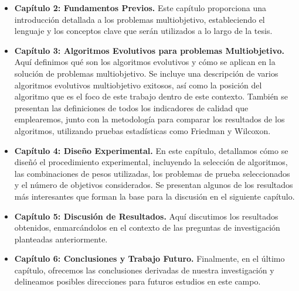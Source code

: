 \begin{itemize}
    \item \textbf{Capítulo 2: Fundamentos Previos.} Este capítulo proporciona una introducción detallada a los problemas multiobjetivo, estableciendo el lenguaje y los conceptos clave que serán utilizados a lo largo de la tesis.
    \item \textbf{Capítulo 3: Algoritmos Evolutivos para problemas Multiobjetivo.} Aquí definimos qué son los algoritmos evolutivos y cómo se aplican en la solución de problemas multiobjetivo. Se incluye una descripción de varios algoritmos evolutivos multiobjetivo exitosos, así como la posición del algoritmo que es el foco de este trabajo dentro de este contexto. También se presentan las definiciones de todos los indicadores de calidad que emplearemos, junto con la metodología para comparar los resultados de los algoritmos, utilizando pruebas estadísticas como Friedman y Wilcoxon.
    \item \textbf{Capítulo 4: Diseño Experimental.} En este capítulo, detallamos cómo se diseñó el procedimiento experimental, incluyendo la selección de algoritmos, las combinaciones de pesos utilizadas, los problemas de prueba seleccionados y el número de objetivos considerados. Se presentan algunos de los resultados más interesantes que forman la base para la discusión en el siguiente capítulo.
    \item \textbf{Capítulo 5: Discusión de Resultados.} Aquí discutimos los resultados obtenidos, enmarcándolos en el contexto de las preguntas de investigación planteadas anteriormente.
    \item \textbf{Capítulo 6: Conclusiones y Trabajo Futuro.} Finalmente, en el último capítulo, ofrecemos las conclusiones derivadas de nuestra investigación y delineamos posibles direcciones para futuros estudios en este campo.
\end{itemize}





